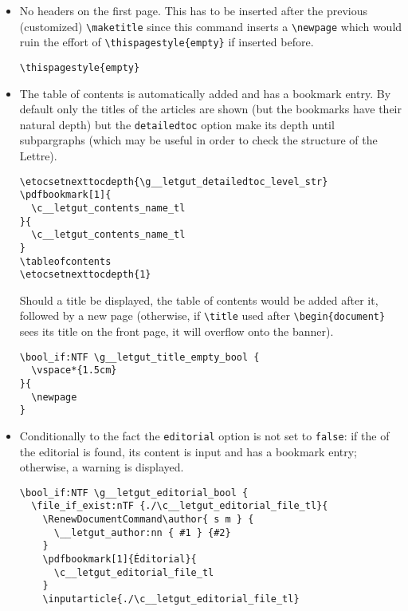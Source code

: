 \documentclass{letgut}
\begin{document}
\begin{itemize}
\item No headers on the first page. This has to be inserted after the previous
(customized) \lstinline+\maketitle+ since this command inserts a \lstinline+\newpage+ which would
ruin the effort of \lstinline+\thispagestyle{empty}+ if inserted before.
\begin{lstlisting}
\thispagestyle{empty}
\end{lstlisting}
\item The table of contents is automatically added and has a bookmark entry. By
default only the titles of the articles are shown (but the bookmarks have
their natural depth) but the \lstinline+detailedtoc+ option make its depth until
subpargraphs (which may be useful in order to check the structure of the
Lettre).
\begin{lstlisting}
\etocsetnexttocdepth{\g__letgut_detailedtoc_level_str}
\pdfbookmark[1]{
  \c__letgut_contents_name_tl
}{
  \c__letgut_contents_name_tl
}
\tableofcontents
\etocsetnexttocdepth{1}
\end{lstlisting}
Should a title be displayed, the table of contents would be added after it,
followed by a new page (otherwise, if \lstinline+\title+ used after \lstinline+\begin{document}+
sees its title on the front page, it will overflow onto the banner).
\begin{lstlisting}
\bool_if:NTF \g__letgut_title_empty_bool {
  \vspace*{1.5cm}
}{
  \newpage
}
\end{lstlisting}
\item Conditionally to the fact the \lstinline+editorial+ option is not set to \lstinline+false+: if the
 of the editorial is found, its content is input and
has a bookmark entry; otherwise, a warning is displayed.
\begin{lstlisting}
\bool_if:NTF \g__letgut_editorial_bool {
  \file_if_exist:nTF {./\c__letgut_editorial_file_tl}{
    \RenewDocumentCommand\author{ s m } {
      \__letgut_author:nn { #1 } {#2}
    }
    \pdfbookmark[1]{Éditorial}{
      \c__letgut_editorial_file_tl
    }
    \inputarticle{./\c__letgut_editorial_file_tl}
\end{lstlisting}
\end{itemize}
\end{document}
